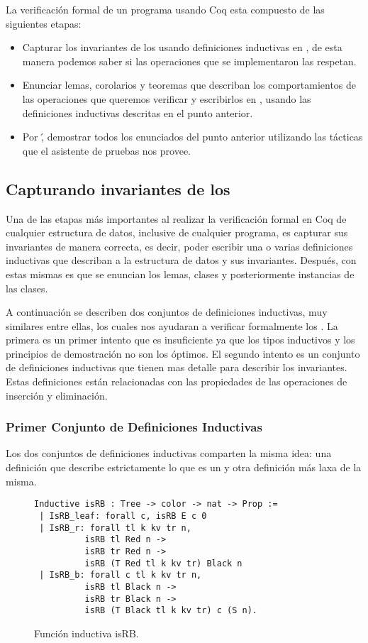 La verificaci\'on formal de un programa usando Coq esta compuesto de las siguientes etapas:
\begin{itemize}
    \item Capturar los invariantes de los {\arns} usando definiciones inductivas en {\coq}, de
    esta manera podemos saber si las operaciones que se implementaron las respetan.
    \item Enunciar lemas, corolarios y teoremas que describan los comportamientos de las
    operaciones que queremos verificar y escribirlos en {\coq}, usando las definiciones inductivas
    descritas en el punto anterior.
    \item Por \', demostrar todos los enunciados del punto anterior utilizando las t\'acticas
    que el asistente de pruebas nos provee.
\end{itemize}{}

\subsection{Capturando invariantes de los {\Arns}}
Una de las etapas m\'as importantes al realizar la verificaci\'on formal en Coq de cualquier estructura de
datos, inclusive de cualquier programa, es capturar sus invariantes de manera correcta, es decir,
poder escribir una o varias definiciones inductivas que describan a la estructura de datos y sus
invariantes. Después, con estas mismas es que se enuncian los lemas, clases y posteriormente
instancias de las clases.

A continuaci\'on se describen dos conjuntos de definiciones inductivas, muy similares entre ellas,
los cuales nos ayudaran a verificar formalmente los {\arns}. La primera es un primer intento que es
insuficiente ya que los tipos inductivos y los principios de demostraci\'on no son los \'optimos.
El segundo intento es un conjunto de definiciones inductivas que tienen mas detalle para describir
los invariantes. Estas definiciones est\'an relacionadas con las propiedades de las operaciones de
inserci\'on y eliminaci\'on.

\subsubsection{Primer Conjunto de Definiciones Inductivas}
Los dos conjuntos de definiciones inductivas comparten la misma idea: una definici\'on que describe
estrictamente lo que es un {\arn} y otra definici\'on m\'as laxa de la misma.

\begin{figure}[!ht]
\centering
\captionsetup{justification=centering}
\begin{verbatim}
Inductive isRB : Tree -> color -> nat -> Prop :=
 | IsRB_leaf: forall c, isRB E c 0
 | IsRB_r: forall tl k kv tr n,
          isRB tl Red n ->
          isRB tr Red n ->
          isRB (T Red tl k kv tr) Black n
 | IsRB_b: forall c tl k kv tr n,
          isRB tl Black n ->
          isRB tr Black n ->
          isRB (T Black tl k kv tr) c (S n).
\end{verbatim}
\caption{Funci\'on inductiva isRB.}
\label{inductive_isRB}
\end{figure}

